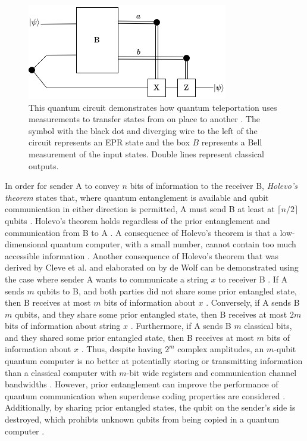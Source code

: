 \begin{figure}[!ht]
	\centering
	\includegraphics[width=0.75\linewidth]{body/ch3/figs/chuang-teleportation}
	\caption[Quantum Circuit for Quantum Teleportation by Chuang and Gottesman.]{This quantum circuit demonstrates how quantum teleportation uses measurements to transfer states from on place to another \cite{gottesman1999demonstrating}. The symbol with the black dot and diverging wire to the left of the circuit represents an EPR state and the box $B$ represents a Bell measurement of the input states. Double lines represent classical outputs.}
	\label{fig:chuang-teleportation}
\end{figure}

In order for sender A to convey $n$ bits of information to the receiver B, \textit{Holevo's theorem} states that, where quantum entanglement is available and qubit communication in either direction is permitted, A must send B at least at $\lceil n/2 \rceil$ qubits \cite{cleve1998quantum, holevo1998quantum}. Holevo's theorem holds regardless of the prior entanglement and communication from B to A \cite{cleve1998quantum}. A consequence of Holevo's theorem is that a low-dimensional quantum computer, with a small number, cannot contain too much accessible information \cite{DeWolf2019}. Another consequence of Holevo's theorem that was derived by Cleve et al. and elaborated on by de Wolf can be demonstrated using the case where sender A wants to communicate a string $x$ to receiver B \cite{cleve1998quantum, DeWolf2019}. If A sends $m$ qubits to B, and both parties did not share some prior entangled state, then B receives at most $m$ bits of information about $x$ \cite{cleve1998quantum, DeWolf2019}. Conversely, if A sends B $m$ qubits, and they share some prior entangled state, then B receives at most $2m$ bits of information about string $x$ \cite{cleve1998quantum, DeWolf2019}. Furthermore, if A sends B $m$ classical bits, and they shared some prior entangled state, then B receives at most $m$ bits of information about $x$ \cite{cleve1998quantum, DeWolf2019}. Thus, despite having $2^m$ complex amplitudes, an $m$-qubit quantum computer is no better at potentially storing or transmitting information than a classical computer with $m$-bit wide registers and communication channel bandwidths \cite{DeWolf2019}. However, prior entanglement can improve the performance of quantum communication when superdense coding properties are considered \cite{DeWolf2019}. Additionally, by sharing prior entangled states, the qubit on the sender's side is destroyed, which prohibts unknown qubits from being copied in a quantum computer \cite{DeWolf2019}.

